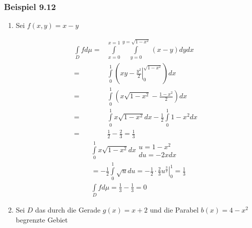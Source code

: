 \subsubsection*{Beispiel 9.12}
\begin{enumerate}
\item Sei $f\left( x,y\right)=x-y$

\begin{center}
\end{center}

\begin{align*}
\int\limits_D fd\mu =&\int\limits_{x=0}^{x=1}\int\limits_{y=0}^{y=\sqrt{1-x^2}}\left( x-y\right) dy dx\\
 =&\int\limits_0^1 {\left( {\left. {xy - \frac{{{y^2}}}{2}} \right|_0^{\sqrt {1 - {x^2}} }} \right)} dx\\
=&\int\limits_0^1 {\left( {x\sqrt {1 - {x^2}}  - \frac{{1 - {x^2}}}{2}} \right)dx}\\
=&\int\limits_0^1 {x\sqrt {1 - {x^2}} } dx - \frac{1}{2}\int\limits_0^1 {1 - {x^2}dx}\\
 =&\frac{1}{2} - \frac{2}{3} = \frac{1}{3}
\end{align*}
\begin{align*}
&\int\limits_0^1 {x\sqrt {1 - {x^2}} dx} \begin{array}{*{20}{c}}
{u = 1 - {x^2}}\\
{du =  - 2xdx}
\end{array}\\
&=  - \frac{1}{2}\int\limits_0^1 {\sqrt u du}  = \left. { - \frac{1}{2} \cdot \frac{2}{3}{u^{\frac{3}{2}}}} \right|_0^1 = \frac{1}{3}\\
&\int\limits_D {fd\mu  = \frac{1}{3} - \frac{1}{3} = 0}
\end{align*}
\item Sei $D$  das durch die Gerade $g(x)=x+2$ und die Parabel $b(x)=4-x^2$ begrenzte Gebiet


\end{enumerate}
